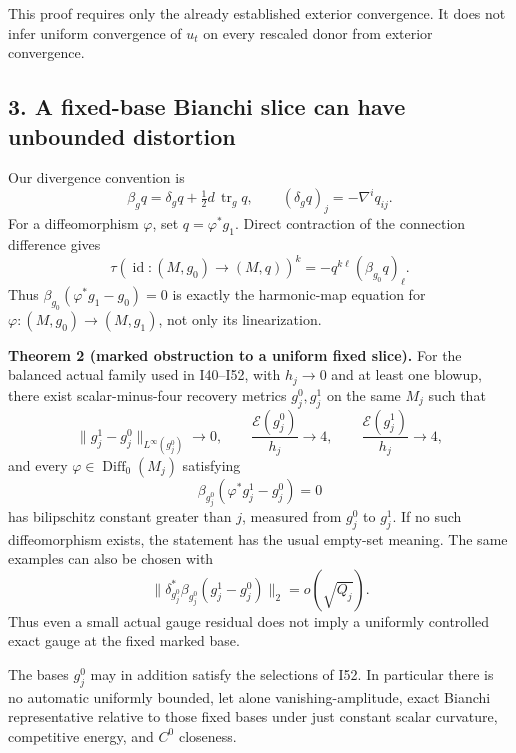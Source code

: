 \documentclass[
  10pt,
]{article}
\begin{document}
This proof requires only the already established exterior convergence.
It does not infer uniform convergence of \(u_t\) on every rescaled donor
from exterior convergence.

\hypertarget{a-fixed-base-bianchi-slice-can-have-unbounded-distortion}{%
\subsection{3. A fixed-base Bianchi slice can have unbounded
distortion}\label{a-fixed-base-bianchi-slice-can-have-unbounded-distortion}}

Our divergence convention is \[
 \beta_g q=\delta_gq+\tfrac12d\,\operatorname{tr}_gq,\qquad
 (\delta_gq)_j=-\nabla^i q_{ij}.
\] For a diffeomorphism \(\varphi\), set \(q=\varphi^*g_1\). Direct
contraction of the connection difference gives \[
 \tau(\operatorname{id}:(M,g_0)\to(M,q))^k
       =-q^{k\ell}(\beta_{g_0}q)_\ell.                         \tag{3.1}
\] Thus \(\beta_{g_0}(\varphi^*g_1-g_0)=0\) is exactly the harmonic-map
equation for \(\varphi:(M,g_0)\to(M,g_1)\), not only its linearization.

\textbf{Theorem 2 (marked obstruction to a uniform fixed slice).} For
the balanced actual family used in I40--I52, with \(h_j\to0\) and at
least one blowup, there exist scalar-minus-four recovery metrics
\(g_j^0,g_j^1\) on the same \(M_j\) such that \[
 \|g_j^1-g_j^0\|_{L^\infty(g_j^0)}\longrightarrow0,\qquad
 \frac{\mathcal E(g_j^0)}{h_j}\longrightarrow4,\qquad
 \frac{\mathcal E(g_j^1)}{h_j}\longrightarrow4,                 \tag{3.2}
\] and every \(\varphi\in\operatorname{Diff}_0(M_j)\) satisfying \[
 \beta_{g_j^0}(\varphi^*g_j^1-g_j^0)=0                         \tag{3.3}
\] has bilipschitz constant greater than \(j\), measured from \(g_j^0\)
to \(g_j^1\). If no such diffeomorphism exists, the statement has the
usual empty-set meaning. The same examples can also be chosen with \[
 \|\delta_{g_j^0}^*\beta_{g_j^0}(g_j^1-g_j^0)\|_2=o(\sqrt{Q_j}).
                                                               \tag{3.3a}
\] Thus even a small actual gauge residual does not imply a uniformly
controlled exact gauge at the fixed marked base.

The bases \(g_j^0\) may in addition satisfy the selections of I52. In
particular there is no automatic uniformly bounded, let alone
vanishing-amplitude, exact Bianchi representative relative to those
fixed bases under just constant scalar curvature, competitive energy,
and \(C^0\) closeness.
\end{document}
